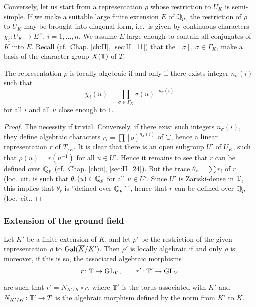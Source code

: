 Conversely, let us start from a representation $\rho$ whose restriction to $U_K$
is semi-simple. If we make a suitable large finite extension $E$ of $\mathbb{Q}_p$, the
restriction of $\rho$ to $U_K$ may be brought into diagonal form, i.e.\ is given
by continuous characters $\chi_i \colon U_K \to E^{\times}$, $i = 1, \hdots,n$.
We assume $E$ large enough to contain all conjugates of $K$ into $E$. Recall
(cf.\ Chap. \ref{ch:II}, \ref{sec:II_11}) that the $[\sigma]$, $\sigma\in
\Gamma_K$, make a basis of the character group $X(\mathbb{T})$ of $T$.

\begin{prop}
The representation $\rho$ is locally algebraic if and only if there exists
integer $n_\sigma(i)$ such that
\[
	\chi_i (u) = \prod_{\sigma \in \Gamma_K} \sigma(u)^{- n_\sigma(i)}
\]
for all $i$ and all $u$ close enough to $1$.
\end{prop}

\begin{proof}
The necessity if trivial. Conversely, if there exist such integers
$n_\sigma(i)$, they define algebraic characters $r_i = \prod
[\sigma]^{n_\sigma(i)}$ of $\mathbb{T}$, hence a linear representation $r$ of $T_{/E}$.
It is clear that there is an open subgroup $U'$ of $U_K$, such that $\rho(u) =
r(u^{-1})$ for all $u \in U'$. Hence it remains to see that $r$ can be defined
over $\mathbb{Q}_p$ (cf.\ Chap. \ref{ch:ii}, \ref{sec:II_24}). But the trace $\theta_r =
\sum r_i$ of $r$ (loc.\ cit.\) is such that $\theta_r(u) \in \mathbb{Q}_p$ for all $u
\in U'$. Since $U'$ is Zariski-dense in $\mathbb{T}$, this implies that $\theta_r$ is
''defined over $\mathbb{Q}_p$´´, hence that $r$ can be defined over $\mathbb{Q}_p$ (loc.\
cit.\).
\end{proof}
 
\subsubsection{Extension of the ground field}

Let $K'$ be a finite extension of $K$, and let $\rho'$ be the restriction of the
given representation $\rho$ to $\operatorname{Gal}(\overline{K}/K')$. Then $\rho'$ is locally
algebraic if and only \todo[pinktask]{falta un if?} $\rho$ is; moreover, if this is so,
the associated algebraic morphisms
\[
r \colon \mathbb{T} \to \operatorname{GL}_V ,\qquad r' \colon \mathbb{T}' \to \operatorname{GL}_V
\]

are such that $r' = N_{K'/K} \circ r$, where $\mathbb{T}'$ is the
torus associated with $K'$ and $N_{K'/K} \colon \mathbb{T}' \to T$ is the algebraic
morphism defined by the norm from $K'$ to $K$.

